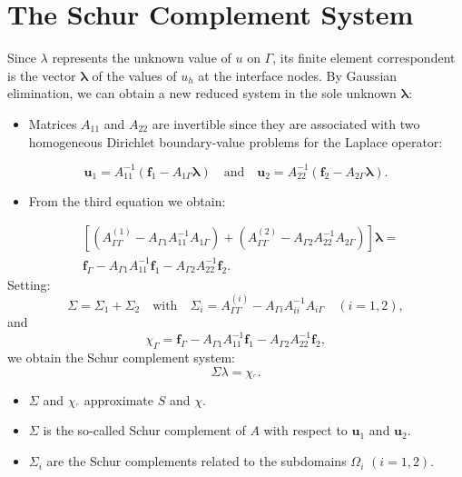 \documentclass[11pt]{book}
\begin{document}
\section{The Schur Complement System}
Since $\lambda$ represents the unknown value of $u$ on $\Gamma$, its finite element correspondent is the vector $\boldsymbol{\lambda}$ of the values of $u_{h}$ at the interface nodes. By Gaussian elimination, we can obtain a new reduced system in the sole unknown $\boldsymbol{\lambda}$:
\begin{itemize}
  \item Matrices $A_{11}$ and $A_{22}$ are invertible since they are associated with two homogeneous Dirichlet boundary-value problems for the Laplace operator:
\end{itemize}
\begin{equation}
\mathbf{u}_{1} = A_{11}^{-1}(\mathbf{f}_{1} - A_{1 \Gamma} \boldsymbol{\lambda}) \quad \text{and} \quad \mathbf{u}_{2} = A_{22}^{-1}(\mathbf{f}_{2} - A_{2 \Gamma} \boldsymbol{\lambda}).
\end{equation}
\begin{itemize}
  \item From the third equation we obtain:
\end{itemize}
\begin{equation*}
\begin{aligned}
& \left[\left(A_{\Gamma \Gamma}^{(1)} - A_{\Gamma 1} A_{11}^{-1} A_{1 \Gamma}\right) + \left(A_{\Gamma \Gamma}^{(2)} - A_{\Gamma 2} A_{22}^{-1} A_{2 \Gamma}\right)\right] \boldsymbol{\lambda} = \\
& \mathbf{f}_{\Gamma} - A_{\Gamma 1} A_{11}^{-1} \mathbf{f}_{1} - A_{\Gamma 2} A_{22}^{-1} \mathbf{f}_{2}.
\end{aligned}
\end{equation*}
Setting:
\begin{equation*}
\Sigma = \Sigma_{1} + \Sigma_{2} \quad \text{with} \quad \Sigma_{i} = A_{\Gamma \Gamma}^{(i)} - A_{\Gamma i} A_{i i}^{-1} A_{i \Gamma} \quad (i=1,2),
\end{equation*}
and
\begin{equation*}
\chi_{\Gamma} = \mathbf{f}_{\Gamma} - A_{\Gamma 1} A_{11}^{-1} \mathbf{f}_{1} - A_{\Gamma 2} A_{22}^{-1} \mathbf{f}_{2},
\end{equation*}
we obtain the Schur complement system:
\begin{equation*}
\Sigma \lambda = \chi_{\ulcorner}.
\end{equation*}
\begin{itemize}
  \item $\Sigma$ and $\chi_{\ulcorner}$ approximate $S$ and $\chi$.
  \item $\Sigma$ is the so-called Schur complement of $A$ with respect to $\mathbf{u}_{1}$ and $\mathbf{u}_{2}$.
  \item $\Sigma_{i}$ are the Schur complements related to the subdomains $\Omega_{i}$ $(i=1,2)$.
\end{itemize}
\end{document}
